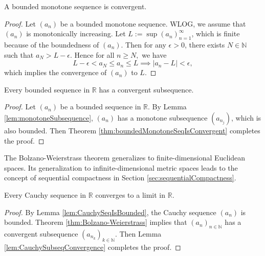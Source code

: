 \begin{thm}
  \label{thm:boundedMonotoneSeqIsConvergent}
  A bounded monotone sequence is convergent.
\end{thm}
\begin{proof}
  Let $(a_{n})$ be a bounded monotone sequence.
  WLOG, we assume that $(a_{n})$ is monotonically increasing.
  Let $L:=\sup(a_{n})_{n=1}^{\infty}$, which is finite because of
  the boundedness of $(a_{n})$.
  Then for any $\epsilon>0$, there exists $N\in \mathbb{N}$ such that
  $a_{N}>L-\epsilon$. Hence for all $n\ge N,$ we have
  \begin{displaymath}
    L-\epsilon<a_{N}\le a_{n}\le L \implies |a_{n}-L|<\epsilon,
  \end{displaymath}
  which implies the convergence of $(a_{n})$ to $L$.
\end{proof}

\begin{thm}
  \label{thm:Bolzano-Weierstrass}
  Every bounded sequence in $\mathbb{R}$
  has a convergent subsequence.
\end{thm}
\begin{proof}
  Let $(a_{n})$ be a bounded sequence in $\mathbb{R}$.
  By Lemma \ref{lem:monotoneSubsequence},
  $(a_{n})$ has a monotone subsequence $(a_{n_{j}})$,
  which is also bounded.
  Then Theorem \ref{thm:boundedMonotoneSeqIsConvergent}
  completes the proof.
\end{proof}

\begin{rem}
  The Bolzano-Weierstrass theorem generalizes
  to finite-dimensional Euclidean spaces.
  Its generalization to infinite-dimensional metric spaces
  leads to the concept of sequential compactness
  in Section \ref{sec:sequentialCompactness}. 
\end{rem}

\begin{thm}%
  \label{thm:realCauchySeqConverges}
  Every Cauchy sequence in $\mathbb{R}$
  converges to a limit in $\mathbb{R}$.
\end{thm}
\begin{proof}
  By Lemma \ref{lem:CauchySeqIsBounded},
  the Cauchy sequence $(a_n)$ is bounded.
  Theorem \ref{thm:Bolzano-Weierstrass}
  implies that $(a_n)_{n\in \mathbb{N}}$ has a convergent
  subsequence $(a_{n_k})_{k\in \mathbb{N}}$.
  Then Lemma \ref{lem:CauchySubseqConvergence}
  completes the proof.
\end{proof}

